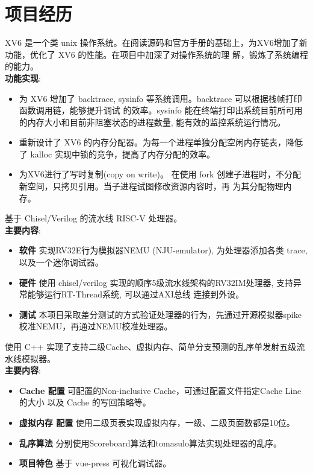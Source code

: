 \documentclass{resume}
\begin{document}


\section{项目经历}

  XV6 是一个类 unix 操作系统。在阅读源码和官方手册的基础上，为XV6增加了新功能，优化了 XV6 的性能。在项目中加深了对操作系统的理
  解，锻炼了系统编程的能力。
 \\   \textbf{功能实现}:  
\begin{itemize}
 \item 为 XV6 增加了 backtrace, sysinfo 等系统调用。backtrace 可以根据栈帧打印函数调用链，能够提升调试
 的效率。sysinfo 能在终端打印出系统目前所可用的内存大小和目前非阻塞状态的进程数量, 能有效的监控系统运行情况。
 \item 重新设计了 XV6 的内存分配器。为每一个进程单独分配空闲内存链表，降低了 kalloc 实现中锁的竞争，提高了内存分配的效率。
 \item 为XV6进行了写时复制(copy on write)。 在使用 fork 创建子进程时，不分配新空间，只拷贝引用。当子进程试图修改资源内容时，再
 为其分配物理内存。
\end{itemize}

  基于 Chisel/Verilog 的流水线 RISC-V 处理器。 
 \\   \textbf{主要内容}:  
  \begin{itemize}
    \item \textbf{软件} 实现RV32E行为模拟器NEMU (NJU-emulator), 为处理器添加各类 trace, 以及一个迷你调试器。
    \item \textbf{硬件} 使用 chisel/verilog 实现的顺序5级流水线架构的RV32IM处理器, 支持异常能够运行RT-Thread系统, 可以通过AXI总线
    连接到外设。
    \item \textbf{测试} 本项目采取差分测试的方式验证处理器的行为，先通过开源模拟器spike校准NEMU，再通过NEMU校准处理器。
\end{itemize}

 使用 C++ 实现了支持二级Cache、虚拟内存、简单分支预测的乱序单发射五级流水线模拟器。
 \\   \textbf{主要内容}:  
  \begin{itemize}
    \item \textbf{Cache 配置} 可配置的Non-inclusive Cache，可通过配置文件指定Cache Line的大小 以及 Cache 的写回策略等。 
    \item \textbf{虚拟内存 配置} 使用二级页表实现虚拟内存，一级、二级页面数都是10位。
    \item \textbf{乱序算法} 分别使用Scoreboard算法和tomasulo算法实现处理器的乱序。
    \item \textbf{项目特色} 基于 vue-press 可视化调试器。
\end{itemize}
\end{document}
